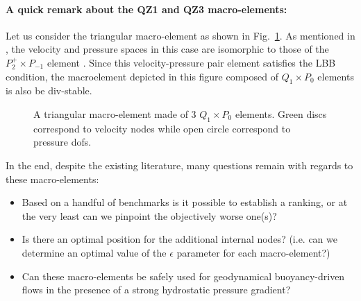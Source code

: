 \documentclass[a4paper]{article}
\begin{document}
\paragraph{A quick remark about the QZ1 and QZ3 macro-elements:}
Let us consider the triangular macro-element as shown in Fig.~\ref{fig:triangle}.
As mentioned in \cite{rovira1992}, 
the velocity and pressure spaces in this case are isomorphic to those
of the $P_2^+ \times P_{-1}$ element \cite{thba25}. Since this velocity-pressure pair 
element satisfies the LBB condition, the macroelement depicted in this figure
composed of $Q_1 \times P_0$ elements is also be div-stable.

\begin{figure}
\centering
{}
\caption{A triangular macro-element made of 3 $Q_1\times P_0$ elements.
Green discs correspond to velocity nodes while open circle correspond to pressure dofs.}\label{fig:triangle}
\end{figure}

\vspace{.4cm}


In the end, despite the existing literature, many questions remain with regards to these macro-elements:
\begin{itemize}
\item Based on a handful of benchmarks is it possible to establish a ranking, or at the very least can we pinpoint the objectively worse one(s)?

\item Is there an optimal position for the additional internal nodes? (i.e. can we determine an optimal value of the 
$\epsilon$ parameter for each macro-element?)

\item Can these macro-elements be safely used for geodynamical 
buoyancy-driven flows in the presence of a strong hydrostatic pressure gradient?
\end{itemize}
\end{document}
